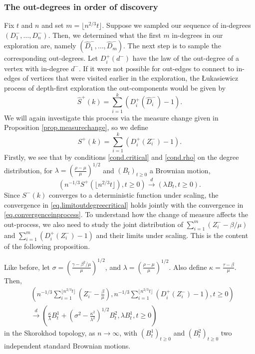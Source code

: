 \subsubsection{The out-degrees in order of discovery}\label{subsubsection.out-degrees}
Fix $t$ and $n$ and set $m=\lfloor  n^{2/3} t\rfloor$. Suppose we sampled our sequence of in-degrees $(D^-_1,\dots,D_n^-)$. Then, we determined what the first $m$ in-degrees in our exploration are, namely $(\hat{D}_1^-,\dots,\hat{D}_m^-)$. The next step is to sample the corresponding out-degrees. Let $D^+_i(d^-)$ have the law of the out-degree of a vertex with in-degree $d^-$. If it were not possible for out-edges to connect to in-edges of vertices that were visited earlier in the exploration, the \L ukasiewicz process of depth-first exploration the out-components would be given by 
 $$ \hat{S}^+(k)=\sum\limits_{i=1}^k (D^+_i(\hat{D}^-_i)-1).$$
 We will again investigate this process via the measure change given in Proposition \ref{prop.measurechange}, so we define $$ {S}^+(k)=\sum\limits_{i=1}^k (D^+_i(Z^-_i)-1).$$ 
 Firstly, we see that by conditions \ref{cond.critical} and \ref{cond.rho} on the degree distribution, for $\lambda=\left(\frac{\rho-\mu}{\mu}\right)^{1/2}$ and $(B_t)_{t\geq0}$ a Brownian motion, \begin{equation} \label{eq.limitoutdegreecritical}\left(n^{-1/3}S^+(\lfloor n^{2/3}t\rfloor) ,t\geq 0\right)\overset{d}{\to}(\lambda B_t,t\geq 0).\end{equation}
 Since $S^-(k)$ converges to a deterministic function under scaling, the convergence in \eqref{eq.limitoutdegreecritical} holds jointly with the convergence in \eqref{eq.convergenceinprocess}. To understand how  the change of measure affects the out-process, we also need to study the joint distribution of  $\sum_{i=1}^m(Z^-_i-\beta/\mu)$ and $\sum_{i=1}^m(D^+_i(Z^-_i)-1)$ and their limits under scaling. This is the content of the following proposition.
\begin{proposition}
\label{prop.jointconvergenceinout}
 Like before, let $\sigma=\left(\frac{\gamma-\beta^2/\mu}{\mu}\right)^{1/2}$, and $\lambda=\left(\frac{\rho-\mu}{\mu}\right)^{1/2}$. Also define $\kappa=\frac{\tau-\beta}{\mu}$. Then,
 \begin{align*} &\left(n^{-1/3}\sum\limits_{i=1}^{\lfloor  n^{2/3}t\rfloor} \left(Z^-_i-\frac{\beta}{\mu}\right),n^{-1/3}\sum\limits_{i=1}^{\lfloor  n^{2/3} t\rfloor} \left(D^+_i(Z^-_i)-1\right), t\geq 0\right)\\
 &\overset{d}{\to} \left(\frac{\kappa}{\lambda}B_t^1+\left(\sigma^2-\frac{\kappa^2}{\lambda^2}\right)^{1/2}B_t^2   ,\lambda B_t^1, t\geq 0 \right)\end{align*}
 in the Skorokhod topology, as $n\to \infty$, with $(B^1_t)_{t\geq 0}$ and $(B^2_t)_{t\geq 0}$ two independent standard Brownian motions. 
\end{proposition} 
